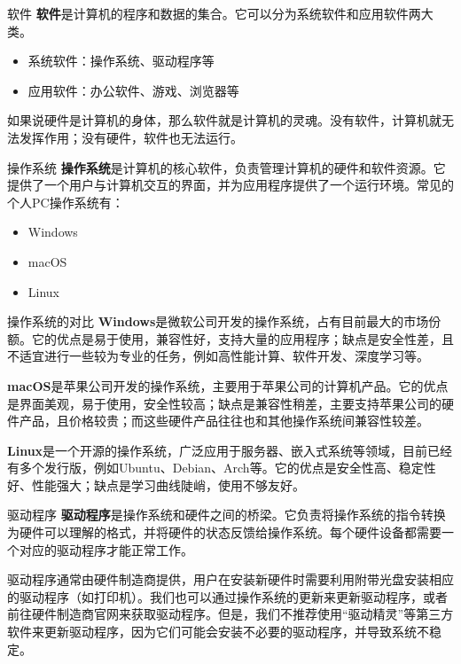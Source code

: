\documentclass{beamer}
\begin{document}
\begin{frame}{软件}
    \textbf{软件}是计算机的程序和数据的集合。它可以分为系统软件和应用软件两大类。

    \begin{itemize}
        \item 系统软件：操作系统、驱动程序等
        \item 应用软件：办公软件、游戏、浏览器等
    \end{itemize}

    如果说硬件是计算机的身体，那么软件就是计算机的灵魂。没有软件，计算机就无法发挥作用；没有硬件，软件也无法运行。
\end{frame}

\begin{frame}{操作系统}
    \textbf{操作系统}是计算机的核心软件，负责管理计算机的硬件和软件资源。它提供了一个用户与计算机交互的界面，并为应用程序提供了一个运行环境。常见的个人PC操作系统有：

    \begin{itemize}
        \item Windows
        \item macOS
        \item Linux
    \end{itemize}
\end{frame}

\begin{frame}{操作系统的对比}
    \textbf{Windows}是微软公司开发的操作系统，占有目前最大的市场份额。它的优点是易于使用，兼容性好，支持大量的应用程序；缺点是安全性差，且不适宜进行一些较为专业的任务，例如高性能计算、软件开发、深度学习等。

    \textbf{macOS}是苹果公司开发的操作系统，主要用于苹果公司的计算机产品。它的优点是界面美观，易于使用，安全性较高；缺点是兼容性稍差，主要支持苹果公司的硬件产品，且价格较贵；而这些硬件产品往往也和其他操作系统间兼容性较差。

    \textbf{Linux}是一个开源的操作系统，广泛应用于服务器、嵌入式系统等领域，目前已经有多个发行版，例如Ubuntu、Debian、Arch等。它的优点是安全性高、稳定性好、性能强大；缺点是学习曲线陡峭，使用不够友好。
\end{frame}

\begin{frame}{驱动程序}
    \textbf{驱动程序}是操作系统和硬件之间的桥梁。它负责将操作系统的指令转换为硬件可以理解的格式，并将硬件的状态反馈给操作系统。每个硬件设备都需要一个对应的驱动程序才能正常工作。

    驱动程序通常由硬件制造商提供，用户在安装新硬件时需要利用附带光盘安装相应的驱动程序（如打印机）。我们也可以通过操作系统的更新来更新驱动程序，或者前往硬件制造商官网来获取驱动程序。但是，我们不推荐使用“驱动精灵”等第三方软件来更新驱动程序，因为它们可能会安装不必要的驱动程序，并导致系统不稳定。
\end{frame}
\end{document}
